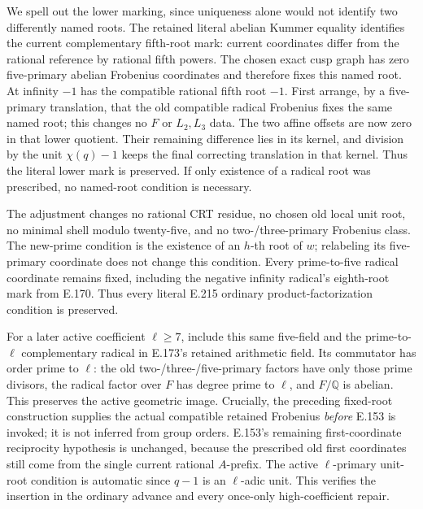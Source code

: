 We spell out the lower marking, since uniqueness alone would not identify
two differently named roots. The retained literal abelian Kummer equality
identifies the current complementary fifth-root mark: current coordinates
differ from the rational reference by rational fifth powers. The chosen
exact cusp graph has zero five-primary abelian Frobenius coordinates and
therefore fixes this named root. At infinity $-1$ has the compatible
rational fifth root $-1$. First arrange, by a five-primary translation,
that the old compatible radical Frobenius fixes the same named root;
this changes no $F$ or $L_2,L_3$ data. The two affine offsets are now zero
in that lower quotient. Their remaining difference lies in its kernel,
and division by the unit $\chi(q)-1$ keeps the final correcting
translation in that kernel. Thus the literal lower mark is preserved.
If only existence of a radical root was prescribed, no named-root
condition is necessary.

The adjustment changes no rational CRT residue, no chosen old local
unit root, no minimal shell modulo twenty-five, and no two-/three-primary
Frobenius class. The new-prime condition is the existence of an $h$-th
root of $w$; relabeling its five-primary coordinate does not change this
condition. Every prime-to-five radical coordinate remains fixed, including
the negative infinity radical's eighth-root mark from E.170. Thus every
literal E.215 ordinary product-factorization condition is preserved.

For a later active coefficient $\ell\ge7$, include this same five-field
and the prime-to-$\ell$ complementary radical in E.173's retained
arithmetic field. Its commutator has order prime to $\ell$: the old
two-/three-/five-primary factors have only those prime divisors, the
radical factor over $F$ has degree prime to $\ell$, and $F/\mathbb Q$
is abelian. This preserves the active geometric image. Crucially, the
preceding fixed-root construction supplies the actual compatible
retained Frobenius \emph{before} E.153 is invoked; it is not inferred
from group orders. E.153's remaining first-coordinate reciprocity
hypothesis is unchanged, because the prescribed old first coordinates
still come from the single current rational $A$-prefix. The active
$\ell$-primary unit-root condition is automatic since $q-1$ is an
$\ell$-adic unit. This verifies the insertion in the ordinary advance
and every once-only high-coefficient repair.

